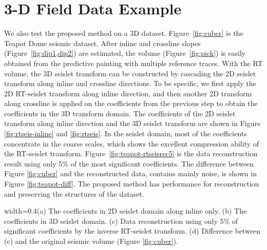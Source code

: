\section{3-D Field Data Example}
    We also test the proposed method on a 3D dataset. 
    Figure~\ref{fig:cuber} is the Teapot Dome seismic dataset. 
    After inline and crossline slopes (Figure~\ref{fig:dip1,dip2}) are 
    estimated, the  volume (Figure~\ref{fig:pick}) is 
    easily obtained from the predictive painting with multiple reference traces. 
    With the RT volume, the 3D seislet transform can be constructed by 
    cascading the 2D seislet transform along inline and crossline directions. 
    To be specific, we first apply the 2D RT-seislet transform along inline 
    direction, and then another 2D transform along crossline is applied on the 
    coefficients from the previous step to obtain the coefficients in the 3D 
    transform domain.
    The coefficients of the 2D seislet transform along inline direction and the 
    3D seislet transform are shown in Figure \ref{fig:rtseis-inline} and 
    \ref{fig:rtseis}.
    In the seislet domain, most of the coefficients concentrate in the coarse 
    scales, which shows the excellent compression ability of the RT-seislet 
    transform. 
    Figure~\ref{fig:teapot-rtseisrec5} is the data reconstruction result using 
    only 5\% of the most significant coefficients. 
    The difference between Figure \ref{fig:cuber} and the reconstructed data, 
    contains mainly noise, is shown in Figure \ref{fig:teapot-diff}.
    The proposed method has  performance for reconstruction and 
    preserving the structures of the dataset.

    {width=0.4\columnwidth}{(a) The coefficients in 2D seislet domain along 
        inline only. (b) The coefficients in 3D seislet domain. 
        (c) Data reconstruction using only 5\% of significant coefficients by 
        the inverse RT-seislet transform.
        (d) Difference between (c) and the original seismic volume 
        (Figure \ref{fig:cuber}).}

